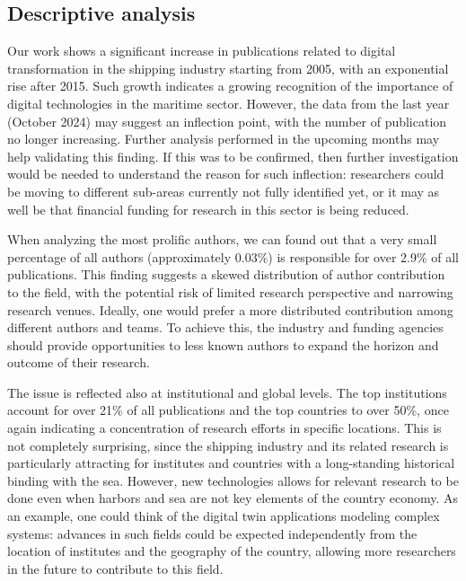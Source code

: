 \documentclass[jmse,review,submit,pdftex,moreauthors]{Definitions/mdpi}
\begin{document}
\subsection{Descriptive analysis}	
Our work shows a significant increase in publications related to digital transformation in the shipping industry starting from 2005, with an exponential rise after 2015. Such growth indicates a growing recognition of the importance of digital technologies in the maritime sector. However, the data from the last year (October 2024) may suggest an inflection point, with the number of publication no longer increasing. Further analysis performed in the upcoming months may help validating this finding. If this was to be confirmed, then further investigation would be needed to understand the reason for such inflection: researchers could be moving to different sub-areas currently not fully identified yet, or it may as well be that financial funding for research in this sector is being reduced.

When analyzing the most prolific authors, we can found out that a very small percentage of all authors (approximately 0.03\%) is responsible for over 2.9\% of all publications. This finding suggests a skewed distribution of author contribution to the field, with the potential risk of limited research perspective and narrowing research venues. Ideally, one would prefer a more distributed contribution among different authors and teams. To achieve this, the industry and funding agencies should provide opportunities to less known authors to expand the horizon and outcome of their research.

The issue is reflected also at institutional and global levels. The top institutions account for over 21\% of all publications and the top countries to over 50\%, once again indicating a concentration of research efforts in specific locations. This is not completely surprising, since the shipping industry and its related research is particularly attracting for institutes and countries with a long-standing historical binding with the sea. However, new technologies allows for relevant research to be done even when harbors and sea are not key elements of the country economy. As an example, one could think of the digital twin applications modeling complex systems: advances in such fields could be expected independently from the location of institutes and the geography of the country, allowing more researchers in the future to contribute to this field.
\end{document}
